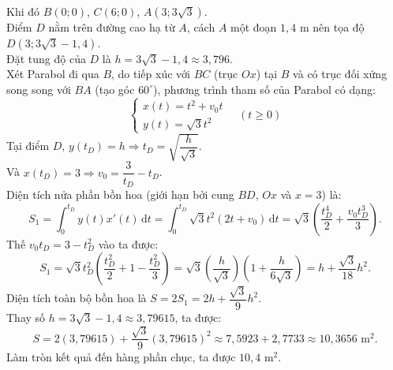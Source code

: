 \begin{ex}
{\begin{center}
		\end{center}
		Khi đó $B(0;0)$, $C(6;0)$, $A(3; 3\sqrt{3})$.
		\\ Điểm $D$ nằm trên đường cao hạ từ $A$, cách $A$ một đoạn $1,4\text{ m}$ nên tọa độ $D(3; 3\sqrt{3} - 1,4)$.
		\\ Đặt tung độ của $D$ là $h = 3\sqrt{3} - 1,4 \approx 3,796$.
		\\ Xét Parabol đi qua $B$, do tiếp xúc với $BC$ (trục $Ox$) tại $B$ và có trục đối xứng song song với $BA$ (tạo góc $60^\circ$), phương trình tham số của Parabol có dạng:
		\[ \begin{cases} x(t) = t^2 + v_0 t \\ y(t) = \sqrt{3}t^2 \end{cases} \quad (t \ge 0) \]
		Tại điểm $D$, $y(t_D) = h \Rightarrow t_D = \sqrt{\dfrac{h}{\sqrt{3}}}$.
		\\ Và $x(t_D) = 3 \Rightarrow v_0 = \dfrac{3}{t_D} - t_D$.
		\\ Diện tích nửa phần bồn hoa (giới hạn bởi cung $BD$, $Ox$ và $x=3$) là:
		\[ S_1 = \int_0^{t_D} y(t) x'(t) \,\text{d}t = \int_0^{t_D} \sqrt{3}t^2 (2t + v_0) \,\text{d}t = \sqrt{3} \left( \dfrac{t_D^4}{2} + \dfrac{v_0 t_D^3}{3} \right). \]
		Thế $v_0 t_D = 3 - t_D^2$ vào ta được:
		\[ S_1 = \sqrt{3} t_D^2 \left( \dfrac{t_D^2}{2} + 1 - \dfrac{t_D^2}{3} \right) = \sqrt{3} \left( \dfrac{h}{\sqrt{3}} \right) \left( 1 + \dfrac{h}{6\sqrt{3}} \right) = h + \dfrac{\sqrt{3}}{18} h^2. \]
		Diện tích toàn bộ bồn hoa là $S = 2S_1 = 2h + \dfrac{\sqrt{3}}{9} h^2$.
		\\ Thay số $h = 3\sqrt{3} - 1,4 \approx 3,79615$, ta được:
		\[ S = 2(3,79615) + \dfrac{\sqrt{3}}{9} (3,79615)^2 \approx 7,5923 + 2,7733 \approx 10,3656 \text{ m}^2. \]
		Làm tròn kết quả đến hàng phần chục, ta được $10,4\text{ m}^2$.
	}
\end{ex}
